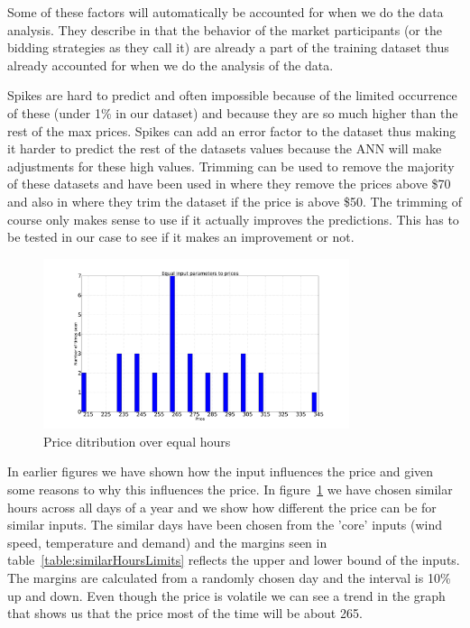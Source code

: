 Some of these factors will automatically be accounted for when we do the data analysis. They describe in \cite{yamin2004adaptive} that the behavior of the market participants (or the bidding strategies as they call it) are already a part of the training dataset thus already accounted for when we do the analysis of the data.

Spikes are hard to predict and often impossible because of the limited occurrence of these (under 1\% in our dataset) and because they are so much higher than the rest of the max prices. Spikes can add an error factor to the dataset thus making it harder to predict the rest of the datasets values because the ANN will make adjustments for these high values. Trimming can be used to remove the majority of these datasets and have been used in \cite{singhal2011electricity} where they remove the prices above \$70 and also in \cite{yamin2004adaptive} where they trim the dataset if the price is above \$50. The trimming of course only makes sense to use if it actually improves the predictions. This has to be tested in our case to see if it makes an improvement or not.

\begin{figure}[H]
\centering
\includegraphics[width=0.8\textwidth ]{billeder/energy_price_plots/same_hour_distribution.png}
\caption{Price ditribution over equal hours}
\label{fig:same_hour_distribution}
\end{figure}

In earlier figures we have shown how the input influences the price and given some reasons to why this influences the price. In figure~\ref{fig:same_hour_distribution} we have chosen similar hours across all days of a year and we show how different the price can be for similar inputs. The similar days have been chosen from the 'core' inputs (wind speed, temperature and demand) and the margins seen in table~\ref{table:similarHoursLimits} reflects the upper and lower bound of the inputs. The margins are calculated from a randomly chosen day and the interval is 10\% up and down. Even though the price is volatile we can see a trend in the graph that shows us that the price most of the time will be about 265.

